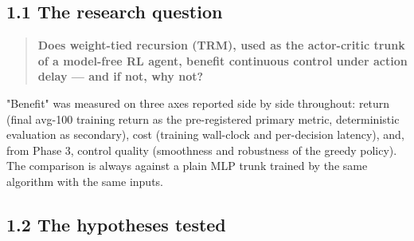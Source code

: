 \documentclass[11pt]{article}
\begin{document}
\subsection*{1.1 The research question}



\begin{quote}\textbf{Does weight-tied recursion (TRM), used as the actor-critic trunk of a model-free RL agent, benefit continuous control under action delay --- and if not, why not?}\end{quote}



"Benefit" was measured on three axes reported side by side throughout: return (final avg-100 training return as the pre-registered primary metric, deterministic evaluation as secondary), cost (training wall-clock and per-decision latency), and, from Phase 3, control quality (smoothness and robustness of the greedy policy). The comparison is always against a plain MLP trunk trained by the same algorithm with the same inputs.



\subsection*{1.2 The hypotheses tested}
\end{document}
